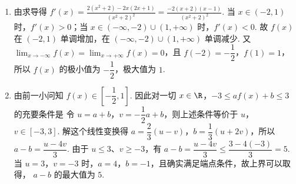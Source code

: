 \begin{solution}
\begin{enumerate}
\item 由求导得 \(f'(x)=\frac{2(x^2+2)-2x(2x+1)}{(x^2+2)^2}=\frac{-2(x+2)(x-1)}{(x^2+2)^2}\).
当 \(x\in(-2,1)\) 时，\(f'(x)>0\)；当 \(x\in(-\infty,-2)\cup(1,+\infty)\) 时，\(f'(x)<0\). 故 \(f(x)\) 在 \((-2,1)\) 单调增加，在 \((-\infty,-2)\cup(1,+\infty)\) 单调减少. 又
\(\displaystyle\lim_{x\to-\infty}f(x)=\lim_{x\to+\infty}f(x)=0\)，且
\(f(-2)=-\dfrac12\)，\(f(1)=1\)，所以 \(f(x)\) 的极小值为 \(-\dfrac12\)，极大值为 \(1\).

\item 由前一小问知 \(f(x)\in\left[-\dfrac12,1\right]\). 因此对一切 \(x\in \R\)，\(-3\le af(x)+b\le3\) 的充要条件是
令 \(u=a+b\)，\(v=-\dfrac12a+b\)，则上述条件等价于
\(u\)，\(v\in[-3,3]\). 解这个线性变换得
\(a=\dfrac23(u-v)\)，\(b=\dfrac13(u+2v)\)，所以
\(a-b=\dfrac{u-4v}{3}\).
由于 \(u\le3\)、\(v\ge-3\)，有
\(a-b=\dfrac{u-4v}{3}\le\dfrac{3-4(-3)}{3}=5\).
当 \(u=3\)，\(v=-3\) 时，\(a=4\)，\(b=-1\)，且确实满足端点条件，故上界可以取得，
\(a-b\) 的最大值为 \(5\).
\end{enumerate}
\end{solution}
